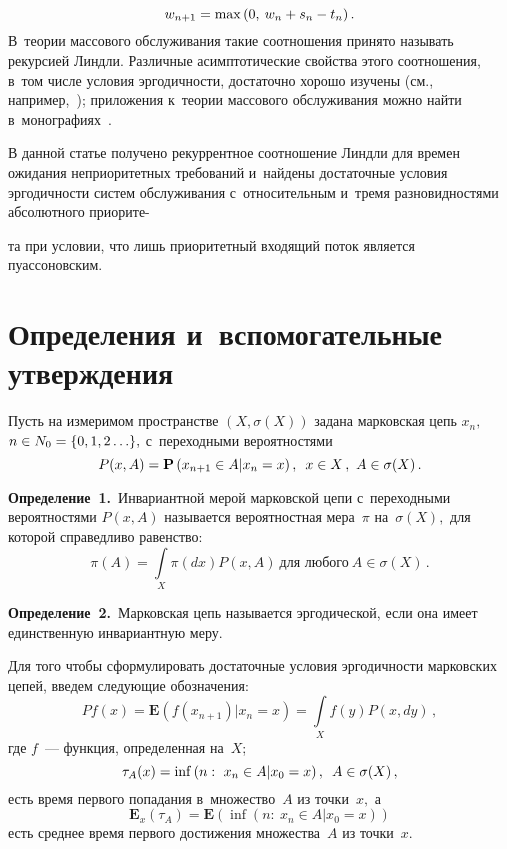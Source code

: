 \begin{multicols}{2}
\noindent
$$
w_{n+1}=\max\left(0,\:w_{n}\hm+s_{n}-t_{n}\right).
$$
 В~тео\-рии массового
обслуживания такие соотношения принято называть рекурсией Линдли.
Различные асимптотические свойства этого соотношения, в~том чис\-ле
усло\-вия эргодичности, достаточно хорошо изучены (см., 
например,~\cite{key-4,key-5}); приложения к~теории массового обслуживания
можно найти в~монографиях~\cite{key-6,key-7}.

В данной статье получено рекуррентное соотношение Линдли для времен
ожидания неприоритетных требований и~найдены достаточные условия
эргодичности сис\-тем обслуживания с~относительным и~тремя
разновидностями абсолютного приорите-\linebreak\vspace*{-12pt}

\pagebreak

\noindent
та при условии, что лишь
приоритетный входящий поток является пуассоновским.



\section{Определения и~вспомогательные утверждения}

Пусть на измеримом пространстве $(X,\sigma (X))$ задана марковская
цепь $x_n,$  $n\hm\in N_{0}\hm=\{0,1,2\ldots\},$ с~переходными
вероятностями 
$$
P(x,A)=\mathbf{P}\left(x_{n+1}\in A|x_{n}=x\right),\enskip x\in X\,,\
A\in\sigma(X)\,.
$$


\noindent
\textbf{Определение~1.}\
Инвариантной мерой марковской цепи с~переходными вероятностями
$P(x,A)$ называется вероятностная мера~$\pi$ на~$\sigma(X),$ для
которой справедливо равенство:
$$
\pi(A)=\int\limits_{X}\pi(dx)P(x,A)\ \mbox{для любого}\
A\in\sigma(X)\,.
$$

\smallskip

\noindent
\textbf{Определение~2.}\
Марковская цепь называется эргодической, если она имеет
единственную инвариантную меру.

\smallskip

Для того чтобы сформулировать достаточные условия эргодичности
марковских цепей, введем сле\-ду\-ющие обозначения:
$$
Pf(x)=\mathbf{E}\left(f(x_{n+1})|x_{n}=x\right)=
\int\limits_{X}f(y)P(x,dy)\,,
$$ 
где $f$~--- функция, определенная на~$X$;
$$
\tau_{A}(x)=\inf\left(n:\ x_n\in A|x_0=x\right),\enskip A\in\sigma(X)\,,
$$
есть время первого попадания в~множество~$A$ из точ\-ки~$x,$ а
$$
\mathbf{E}_{x}\left(\tau_{A}\right)=
\mathbf{E}\left(\inf(n:\:x_n\in A|x_0=x)\right)
$$ 
есть среднее время первого достижения  множества~$A$ из точ\-ки~$x.$


\end{multicols}
